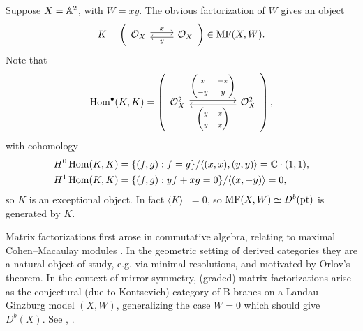 \begin{example}{}{}
     Suppose $X=\mathbb{A}^2$, with $W=xy$. The obvious factorization of $W$ gives an
     object
     \begin{equation*}
         K = \left(\begin{tikzcd}
             \O_X \ar[r,"x",shift left] &
             \O_X \ar[l,"y",shift left]
         \end{tikzcd}\right) \in\MF(X,W).
     \end{equation*}
     Note that
     \begin{equation*}
         \Hom^\bullet(K,K) =
         \left(\begin{tikzcd}[ampersand replacement=\&,column sep=huge]
                 \O_X^2 \ar[shift left]{r}{\begin{pmatrix}
                     x & -x \\ -y & y
                 \end{pmatrix}} \&
                 \O_X^2 \ar[shift left]{l}{\begin{pmatrix}
                     y & x \\ y & x
                 \end{pmatrix}}
         \end{tikzcd}\right),
     \end{equation*}
     with cohomology
     \begin{align*}
         H^0\operatorname{Hom}(K,K) &= \{(f,g):f=g\}/\langle(x,x),(y,y)\rangle
             = \mathbb{C}\cdot(1,1), \\
         H^1\operatorname{Hom}(K,K) &= \{(f,g):yf+xg=0\}/\langle(x,-y)\rangle
             = 0,
     \end{align*}
     so $K$ is an exceptional object. In fact $\langle K\rangle^\perp=0$, so
     $\mathrm{MF}(X,W)\simeq D^b(\mathrm{pt})$ is generated by $K$. %
\end{example}

\begin{remark}{}{}
    Matrix factorizations first arose in commutative algebra, relating to
    maximal Cohen--Macaulay modules \cite{Eisenbud}. In the geometric setting of
    derived categories they are a natural object of study, e.g. via minimal
    resolutions, and motivated by Orlov's theorem. In the context of mirror
    symmetry, (graded) matrix factorizations arise as the conjectural (due to
    Kontsevich) category of B-branes on a Landau--Ginzburg model $(X,W)$,
    generalizing the case $W=0$ which should give $D^b(X)$. See
    \cite{OrlovTheorem}, \cite{Ed}.
\end{remark}

